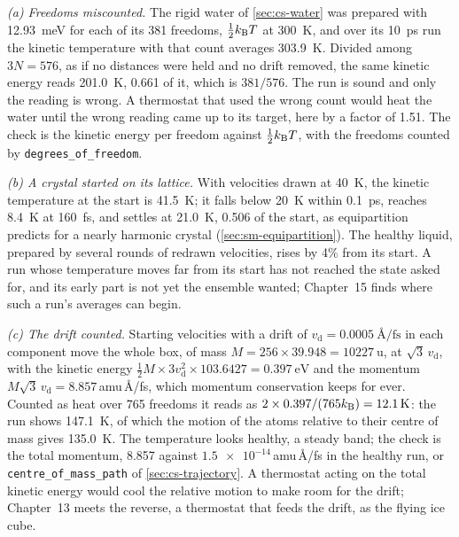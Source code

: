 \emph{(a) Freedoms miscounted.} The rigid water of \cref{sec:cs-water}
was prepared with \SI{12.93}{\milli\electronvolt} for each of its 381
freedoms, $\frac12k_{\mathrm{B}} T$ at \SI{300}{\kelvin}, and over its
\SI{10}{\pico\second} run the kinetic temperature with that count averages
\SI{303.9}{\kelvin}. Divided among $3N = 576$, as if no distances were
held and no drift removed, the same kinetic energy reads
\SI{201.0}{\kelvin}, 0.661 of it, which is $381/576$. The run is sound
and only the reading is wrong. A thermostat that used the wrong count would
heat the water until the wrong reading came up to its target, here by a
factor of 1.51. The check is the kinetic energy per freedom against
$\frac12k_{\mathrm{B}} T$, with the freedoms counted by
\texttt{degrees\_of\_freedom}.

\emph{(b) A crystal started on its lattice.} With velocities drawn at
\SI{40}{\kelvin}, the kinetic temperature at the start is
\SI{41.5}{\kelvin}; it falls below \SI{20}{\kelvin} within
\SI{0.1}{\pico\second}, reaches \SI{8.4}{\kelvin} at
\SI{160}{\femto\second}, and settles at \SI{21.0}{\kelvin}, 0.506 of
the start, as equipartition predicts for a nearly harmonic crystal
(\cref{sec:sm-equipartition}). The healthy liquid, prepared by several
rounds of redrawn velocities, rises by 4\% from its start. A run whose
temperature moves far from its start has not reached the state asked for,
and its early part is not yet the ensemble wanted; Chapter~15 finds where
such a run's averages can begin.

\emph{(c) The drift counted.} Starting velocities with a drift of
$v_{\mathrm d} = \SI{0.0005}{\angstrom\per\femto\second}$ in each component
move the whole box, of mass $M = 256\times39.948 = \SI{10227}{\amu}$, at
$\sqrt3\,v_{\mathrm d}$, with the kinetic energy $\frac12M\times
3v_{\mathrm d}^2\times103.6427 = \SI{0.397}{\electronvolt}$ and the
momentum $M\sqrt3\,v_{\mathrm d} = 8.857$\,amu\,\AA/fs, which momentum
conservation keeps for ever. Counted as heat over 765 freedoms it reads as
$2\times0.397/(765k_{\mathrm{B}}) = \SI{12.1}{\kelvin}$: the run shows \SI{147.1}{\kelvin}, of which the motion
of the atoms relative to their centre of mass gives \SI{135.0}{\kelvin}.
The temperature looks healthy, a steady band; the check is the total
momentum, 8.857 against $\num{1.5e-14}$\,amu\,\AA/fs in the healthy run, or
\texttt{centre\_of\_mass\_path} of \cref{sec:cs-trajectory}. A thermostat
acting on the total kinetic energy would cool the relative motion to make
room for the drift; Chapter~13 meets the reverse, a thermostat that feeds
the drift, as the flying ice cube.

